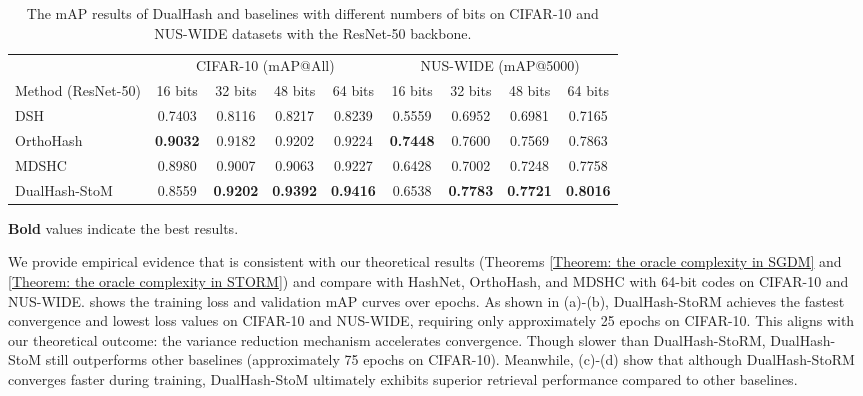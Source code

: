 \begin{table}[!tbp]
    \centering
    \caption{The mAP results of DualHash and baselines with different numbers of bits on CIFAR-10 and NUS-WIDE datasets with the ResNet-50 backbone.}
    \label{Table: performance_comparison_resnet50_small}
    \small
    \setlength{\tabcolsep}{3pt}
    \begin{tabular*}{\linewidth}{@{\extracolsep{\fill}}lcccccccc@{}}
        \toprule
         & \multicolumn{4}{c}{CIFAR-10 (mAP@All)} & \multicolumn{4}{c}{NUS-WIDE (mAP@5000)} \\
        \cmidrule(lr){2-5} \cmidrule(lr){6-9}
         Method (ResNet-50) & 16 bits & 32 bits & 48 bits & 64 bits & 16 bits & 32 bits & 48 bits & 64 bits \\
        \midrule
        DSH~\cite{liuDeepSupervisedHashing} & 0.7403 & 0.8116 & 0.8217 & 0.8239 & 0.5559 & 0.6952 & 0.6981 & 0.7165 \\
        OrthoHash~\cite{hoeOneLossAll2021} & \textbf{0.9032} & 0.9182 & 0.9202 & 0.9224 & \textbf{0.7448} & 0.7600 & 0.7569 & 0.7863 \\
        MDSHC~\cite{wang2023deep} & 0.8980 & 0.9007 & 0.9063 & 0.9227 & 0.6428 & 0.7002 & 0.7248 & 0.7758 \\
        \cmidrule(lr){2-9}
        DualHash-StoM & 0.8559 & \textbf{0.9202} & \textbf{0.9392} & \textbf{0.9416} & 0.6538 & \textbf{0.7783} & \textbf{0.7721} & \textbf{0.8016} \\
        \bottomrule
    \end{tabular*}
    \par\vspace{3pt}
    \parbox{\linewidth}{\footnotesize
    \textbf{Bold} values indicate the best results.
    }
\end{table}
We provide empirical evidence that is consistent with our theoretical results (Theorems \ref{Theorem: the oracle complexity in SGDM} and \ref{Theorem: the oracle complexity in STORM}) and compare with HashNet, OrthoHash, and MDSHC with 64-bit codes on CIFAR-10 and NUS-WIDE. 
 shows the training loss and validation mAP curves over epochs.
As shown in  (a)-(b), DualHash-StoRM achieves the fastest convergence and lowest loss values on CIFAR-10 and NUS-WIDE, requiring only approximately 25 epochs on CIFAR-10. This aligns with our theoretical outcome: the variance reduction mechanism accelerates convergence. Though slower than DualHash-StoRM, DualHash-StoM still outperforms other baselines (approximately 75 epochs on CIFAR-10). 
Meanwhile,  (c)-(d) show that although DualHash-StoRM converges faster during training, DualHash-StoM ultimately exhibits superior retrieval performance compared to other baselines. 
